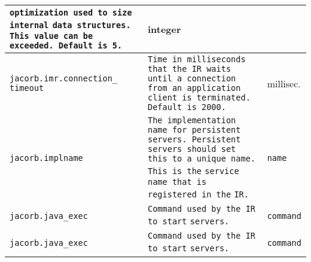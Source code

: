 \documentclass[12pt]{scrbook}
\begin{document}
\begin{small}
\begin{longtable}{|p{5cm}|p{9cm}|p{2cm}|}
\verb"optimization used to size internal"
\verb"data structures. This value can be"
\verb"exceeded. Default is 5." & integer \\
\hline
\verb"jacorb.imr.connection_"
\verb"timeout" & \verb"Time in milliseconds that the IR waits"
\verb"until a connection from an application"
\verb"client is terminated. Default is 2000." & millisec. \\
\hline
\verb"jacorb.implname" & \verb"The implementation name for persistent"
\verb"servers. Persistent servers should set"
\verb"this to a unique name. This is the"
\verb"service name that is registered in the"
\verb"IR." & \verb"name" \\
\hline
\verb"jacorb.java_exec" & \verb"Command used by the IR to start"
\verb"servers." & \verb"command" \\
\hline
\verb"jacorb.java_exec" & \verb"Command used by the IR to start"
\verb"servers." & \verb"command" \\
\hline

\end{longtable}
\end{small}
\end{document}
